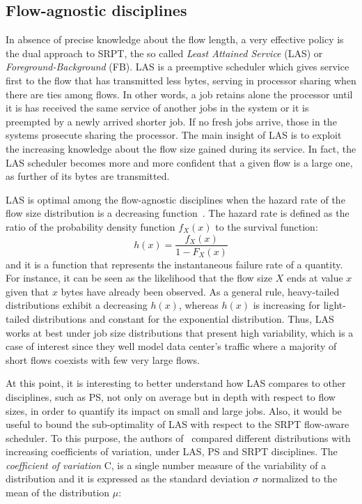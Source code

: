 \subsection{Flow-agnostic disciplines}
\label{sec:las}
In absence of precise knowledge about the flow length, a very effective policy is the dual approach to SRPT, the so called \emph{Least Attained Service} (LAS) or \emph{Foreground-Background} (FB). LAS is a preemptive scheduler which gives service first to the flow that has transmitted less bytes, serving in processor sharing when there are ties among flows. In other words, a job retains alone the processor until it is has received the same service of another jobs in the system or it is preempted by a newly arrived shorter job. If no fresh jobs arrive, those in the systems prosecute sharing the processor. The main insight of LAS is to exploit the increasing knowledge about the flow size gained during its service. In fact, the LAS scheduler becomes more and more confident that a given flow is a large one, as further of its bytes are transmitted. 

LAS is optimal among the flow-agnostic disciplines when the hazard rate of the flow size distribution is a  decreasing function~\cite{Gittins}. The hazard rate is defined as the ratio of the probability density function $f_X(x)$ to the survival function:
\[
	h(x) = \dfrac{f_X(x)}{1-F_X(x)}
\]  and it is a function that represents the instantaneous failure rate of a quantity. For instance, it can be seen as the likelihood that the flow size $X$ ends at value $x$ given that $x$ bytes have already been observed. As a general rule, heavy-tailed distributions exhibit a decreasing $h(x)$, whereas $h(x)$ is increasing for light-tailed distributions and constant for the exponential distribution. Thus, LAS works at best under job size distributions that present high variability, which is a case of interest since they well model data center's traffic where a majority of short flows coexists with few very large flows. 

At this point, it is interesting to better understand how LAS compares to other disciplines, such as PS, not only on average but in depth with respect to flow sizes, in order to quantify its impact on small and large jobs. Also, it would be useful to bound the sub-optimality of LAS with respect to the SRPT flow-aware scheduler.  To this purpose, the authors of~\cite{LAS_analysis} compared different distributions with increasing coefficients of variation, under LAS, PS and SRPT disciplines.  The \emph{coefficient of variation} C, is a single number measure of the variability of a distribution and it is expressed as the standard deviation $\sigma$ normalized to the mean of the distribution $\mu$: 

